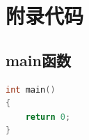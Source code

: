 \documentclass[winfonts,bachelor,twoside]{njuthesis}
\begin{document}
\begin{acknowledgement}
\lipsum[1]

\end{acknowledgement}








\appendix
\chapter{附录代码}\label{app:1}
\section{main函数}
\begin{lstlisting}[language=C]
int main()
{
	return 0;
}
\end{lstlisting}
\end{document}
